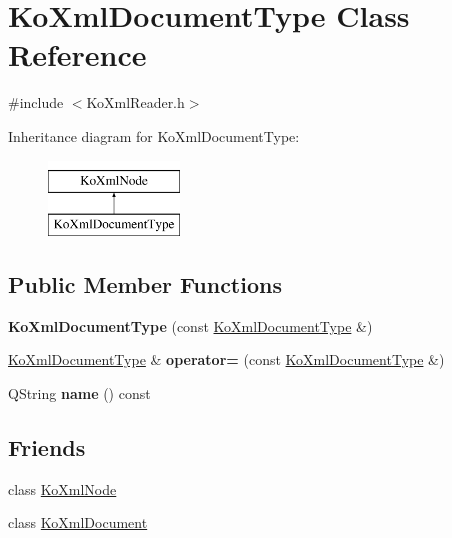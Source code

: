 \hypertarget{classKoXmlDocumentType}{
\section{KoXmlDocumentType Class Reference}
\label{classKoXmlDocumentType}
}


{\ttfamily \#include $<$KoXmlReader.h$>$}

Inheritance diagram for KoXmlDocumentType:\begin{figure}[H]
\begin{center}
\leavevmode
\includegraphics[height=2cm]{classKoXmlDocumentType}
\end{center}
\end{figure}
\subsection*{Public Member Functions}
\begin{DoxyCompactItemize}
\item 
\hypertarget{classKoXmlDocumentType_a8fab4dbc84e6de8408ae05043525740a}{
{\bfseries KoXmlDocumentType} (const \hyperlink{classKoXmlDocumentType}{KoXmlDocumentType} \&)}
\label{classKoXmlDocumentType_a8fab4dbc84e6de8408ae05043525740a}

\item 
\hypertarget{classKoXmlDocumentType_ab013c4a30060086de2797764414ca95c}{
\hyperlink{classKoXmlDocumentType}{KoXmlDocumentType} \& {\bfseries operator=} (const \hyperlink{classKoXmlDocumentType}{KoXmlDocumentType} \&)}
\label{classKoXmlDocumentType_ab013c4a30060086de2797764414ca95c}

\item 
\hypertarget{classKoXmlDocumentType_aa383d3090676752ae75bf24325a44003}{
QString {\bfseries name} () const }
\label{classKoXmlDocumentType_aa383d3090676752ae75bf24325a44003}

\end{DoxyCompactItemize}
\subsection*{Friends}
\begin{DoxyCompactItemize}
\item 
\hypertarget{classKoXmlDocumentType_a6c97883f92c7cbf2ecdf17db6cea8297}{
class \hyperlink{classKoXmlDocumentType_a6c97883f92c7cbf2ecdf17db6cea8297}{KoXmlNode}}
\label{classKoXmlDocumentType_a6c97883f92c7cbf2ecdf17db6cea8297}

\item 
\hypertarget{classKoXmlDocumentType_a7f0a67ef52ddc6542737225a82e4f487}{
class \hyperlink{classKoXmlDocumentType_a7f0a67ef52ddc6542737225a82e4f487}{KoXmlDocument}}
\label{classKoXmlDocumentType_a7f0a67ef52ddc6542737225a82e4f487}

\end{DoxyCompactItemize}


